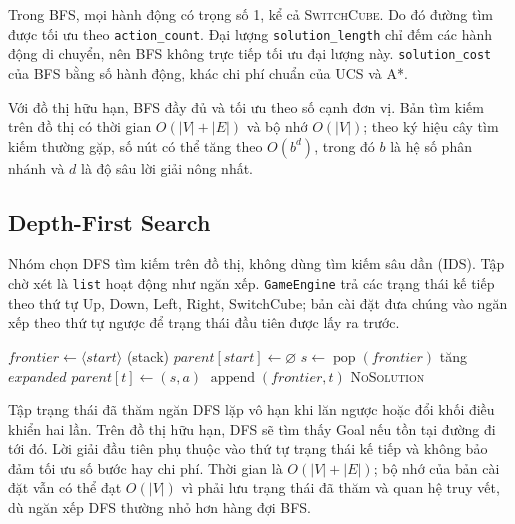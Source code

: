Trong BFS, mọi hành động có trọng số 1, kể cả \textsc{SwitchCube}. Do đó đường tìm
được tối ưu theo \texttt{action\_count}. Đại lượng
\texttt{solution\_length} chỉ đếm các hành động di chuyển, nên BFS không trực
tiếp tối ưu đại lượng này. \texttt{solution\_cost} của BFS bằng số hành động,
khác chi phí chuẩn của UCS và A*.

Với đồ thị hữu hạn, BFS đầy đủ và tối ưu theo số cạnh đơn vị. Bản tìm kiếm trên
đồ thị có thời gian $O(|V|+|E|)$ và bộ nhớ $O(|V|)$; theo ký hiệu cây tìm kiếm thường
gặp, số nút có thể tăng theo $O(b^d)$, trong đó $b$ là hệ số phân nhánh và $d$
là độ sâu lời giải nông nhất.

\subsection{Depth-First Search}

Nhóm chọn DFS tìm kiếm trên đồ thị, không dùng tìm kiếm sâu dần (IDS). Tập chờ xét
là \texttt{list} hoạt động như ngăn xếp. \texttt{GameEngine} trả các trạng thái
kế tiếp theo thứ tự Up, Down, Left, Right, SwitchCube; bản cài đặt đưa chúng
vào ngăn xếp theo thứ tự ngược để trạng thái đầu tiên được lấy ra trước.

\begin{algorithm}[H]
\caption{DFS có chống lặp}
\label{alg:dfs}
\begin{algorithmic}[1]
\State $\mathit{frontier}\gets\langle start\rangle$ (stack)
\State $\mathit{parent}[start]\gets\varnothing$
    \State $s\gets\operatorname{pop}(\mathit{frontier})$
     \State \Return {} \EndIf
    \State tăng $expanded$
            \State $\mathit{parent}[t]\gets(s,a)$
            \State $\operatorname{append}(\mathit{frontier},t)$
        \EndIf
    \EndFor
\EndWhile
\State \Return \textsc{NoSolution}
\EndFunction
\end{algorithmic}
\end{algorithm}

Tập trạng thái đã thăm ngăn DFS lặp vô hạn khi lăn ngược hoặc đổi khối điều
khiển hai lần. Trên đồ thị hữu hạn, DFS sẽ tìm thấy Goal nếu tồn tại đường đi
tới đó. Lời giải đầu tiên phụ thuộc vào thứ tự trạng thái kế tiếp và không bảo
đảm tối ưu số bước hay chi phí. Thời gian là $O(|V|+|E|)$; bộ nhớ của bản cài
đặt vẫn có thể đạt $O(|V|)$ vì phải lưu trạng thái đã thăm và quan hệ truy vết,
dù ngăn xếp DFS thường nhỏ hơn hàng đợi BFS.

